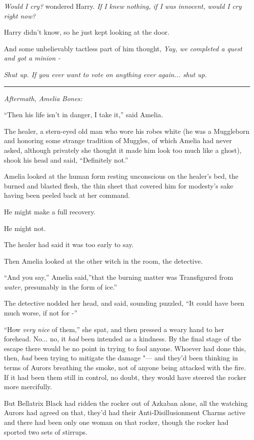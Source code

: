 \emph{Would I cry?} wondered Harry. \emph{If I knew nothing, if I was
innocent, would I cry right now?}

Harry didn't know, so he just kept looking at the door.

And some unbelievably tactless part of him thought, \emph{Yay, we
completed a quest and got a minion -}

\emph{Shut up. If you ever want to vote on anything ever again...
shut up.}

\begin{center}\rule{3in}{0.4pt}\end{center}

\emph{Aftermath, Amelia Bones:}

``Then his life isn't in danger, I take it,'' said Amelia.

The healer, a stern-eyed old man who wore his robes white (he was a
Muggleborn and honoring some strange tradition of Muggles, of which
Amelia had never asked, although privately she thought it made him look
too much like a ghost), shook his head and said, ``Definitely not.''

Amelia looked at the human form resting unconscious on the healer's bed,
the burned and blasted flesh, the thin sheet that covered him for
modesty's sake having been peeled back at her command.

He might make a full recovery.

He might not.

The healer had said it was too early to say.

Then Amelia looked at the other witch in the room, the detective.

``And you say,'' Amelia said,''that the burning matter was Transfigured
from \emph{water}, presumably in the form of ice.''

The detective nodded her head, and said, sounding puzzled, ``It could
have been much worse, if not for -''

``How \emph{very nice} of them,'' she spat, and then pressed a weary hand
to her forehead. No... no, it \emph{had} been intended as a
kindness. By the final stage of the escape there would be no point in
trying to fool anyone. Whoever had done this, then, \emph{had} been
trying to mitigate the damage "--- and they'd been thinking in terms of
Aurors breathing the smoke, not of anyone being attacked with the fire.
If it had been them still in control, no doubt, they would have steered
the rocker more mercifully.

But Bellatrix Black had ridden the rocker out of Azkaban alone, all the
watching Aurors had agreed on that, they'd had their
Anti-Disillusionment Charms active and there had been only one woman on
that rocker, though the rocker had sported two sets of stirrups.

